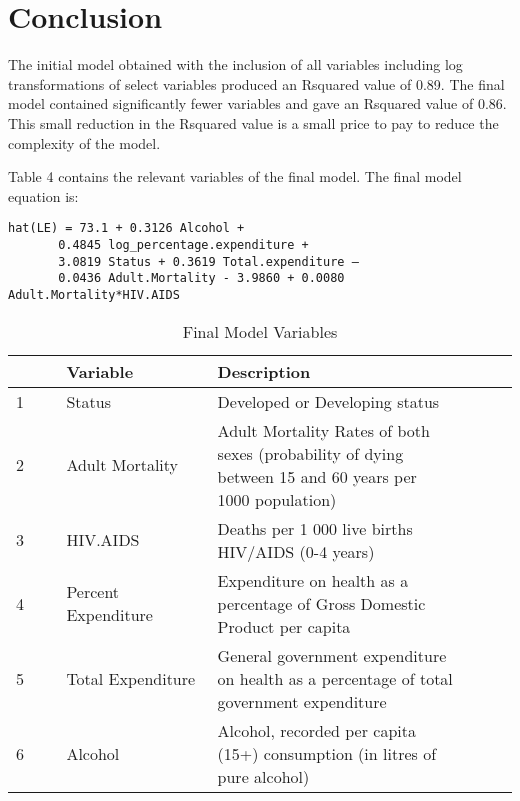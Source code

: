 
\section{Conclusion}
\label{sec:conclusion}

The initial model obtained with the inclusion of all variables including log transformations of select variables produced an Rsquared value of 0.89. The final model contained significantly fewer variables and gave an Rsquared value of 0.86. This small reduction in the Rsquared value is a small price to pay to reduce the complexity of the model.

Table 4 contains the relevant variables of the final model. The final model equation is:

\begin{verbatim}
hat(LE) = 73.1 + 0.3126 Alcohol + 
       0.4845 log_percentage.expenditure + 
       3.0819 Status + 0.3619 Total.expenditure – 
       0.0436 Adult.Mortality - 3.9860 + 0.0080 Adult.Mortality*HIV.AIDS
\end{verbatim}



\begin{table}[ht]
\centering
\begin{tabular}{@{}p{0.1\linewidth}  p{0.3\linewidth}p{0.5\linewidth}p{0.1\linewidth}@{}}
  \toprule
 & Variable & Description \\ 
  \midrule

1 & Status & Developed or Developing status \\ 
  2 & Adult Mortality &  Adult Mortality Rates of both sexes (probability of dying between 15 and 60 years per 1000 population) \\ 
  3 & HIV.AIDS &  Deaths per 1 000 live births HIV/AIDS (0-4 years) \\ 
  4 & Percent Expenditure &  Expenditure on health as a percentage of Gross Domestic Product per capita\\ 
  5 & Total Expenditure &  General government expenditure on health as a percentage of total government expenditure \\ 
 6 & Alcohol &  Alcohol, recorded per capita (15+) consumption (in litres of pure alcohol)\\

\bottomrule
\end{tabular}
\caption{Final Model Variables}
\label{tab:missing}
\end{table}

